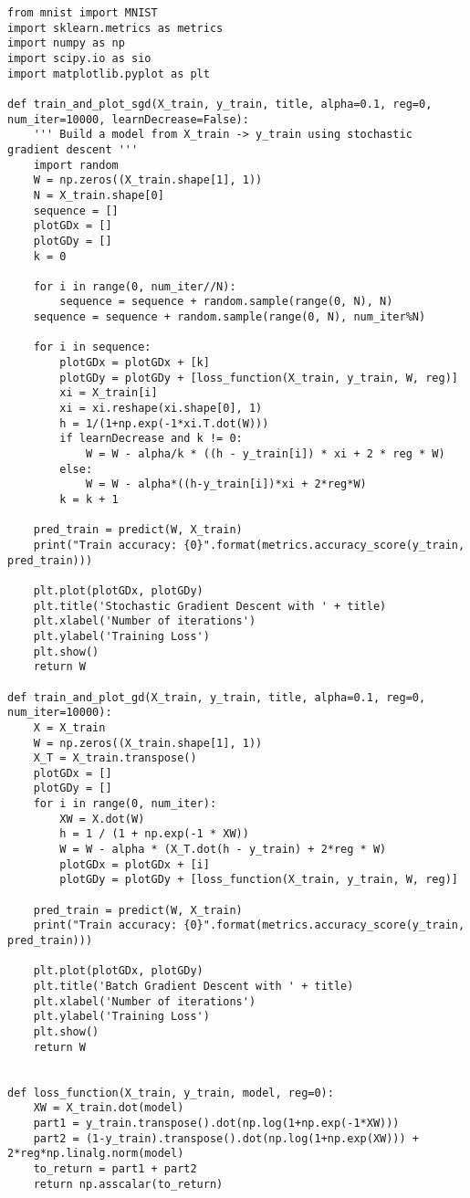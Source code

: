 \documentclass[11pt]{article}
\begin{document}
\newpage
\begin{lstlisting}
from mnist import MNIST
import sklearn.metrics as metrics
import numpy as np
import scipy.io as sio
import matplotlib.pyplot as plt

def train_and_plot_sgd(X_train, y_train, title, alpha=0.1, reg=0, num_iter=10000, learnDecrease=False):
    ''' Build a model from X_train -> y_train using stochastic gradient descent '''
    import random
    W = np.zeros((X_train.shape[1], 1))
    N = X_train.shape[0]
    sequence = []
    plotGDx = []
    plotGDy = []
    k = 0

    for i in range(0, num_iter//N):
        sequence = sequence + random.sample(range(0, N), N)
    sequence = sequence + random.sample(range(0, N), num_iter%N)

    for i in sequence:
        plotGDx = plotGDx + [k]
        plotGDy = plotGDy + [loss_function(X_train, y_train, W, reg)]
        xi = X_train[i]
        xi = xi.reshape(xi.shape[0], 1)
        h = 1/(1+np.exp(-1*xi.T.dot(W)))
        if learnDecrease and k != 0:
            W = W - alpha/k * ((h - y_train[i]) * xi + 2 * reg * W)
        else:
            W = W - alpha*((h-y_train[i])*xi + 2*reg*W)
        k = k + 1

    pred_train = predict(W, X_train)
    print("Train accuracy: {0}".format(metrics.accuracy_score(y_train, pred_train)))

    plt.plot(plotGDx, plotGDy)
    plt.title('Stochastic Gradient Descent with ' + title)
    plt.xlabel('Number of iterations')
    plt.ylabel('Training Loss')
    plt.show()
    return W

def train_and_plot_gd(X_train, y_train, title, alpha=0.1, reg=0, num_iter=10000):
    X = X_train
    W = np.zeros((X_train.shape[1], 1))
    X_T = X_train.transpose()
    plotGDx = []
    plotGDy = []
    for i in range(0, num_iter):
        XW = X.dot(W)
        h = 1 / (1 + np.exp(-1 * XW))
        W = W - alpha * (X_T.dot(h - y_train) + 2*reg * W)
        plotGDx = plotGDx + [i]
        plotGDy = plotGDy + [loss_function(X_train, y_train, W, reg)]

    pred_train = predict(W, X_train)
    print("Train accuracy: {0}".format(metrics.accuracy_score(y_train, pred_train)))

    plt.plot(plotGDx, plotGDy)
    plt.title('Batch Gradient Descent with ' + title)
    plt.xlabel('Number of iterations')
    plt.ylabel('Training Loss')
    plt.show()
    return W


def loss_function(X_train, y_train, model, reg=0):
    XW = X_train.dot(model)
    part1 = y_train.transpose().dot(np.log(1+np.exp(-1*XW)))
    part2 = (1-y_train).transpose().dot(np.log(1+np.exp(XW))) + 2*reg*np.linalg.norm(model)
    to_return = part1 + part2
    return np.asscalar(to_return)


\end{lstlisting}
\end{document}
